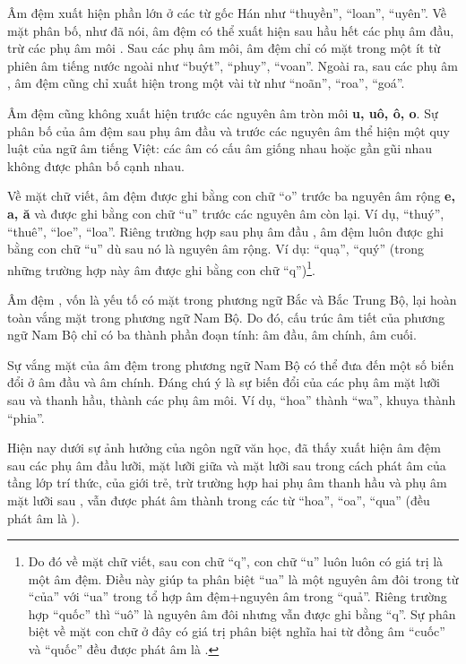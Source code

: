\documentclass[a4paper,oneside,14pt]{extbook} %
\begin{document}
Âm đệm   xuất hiện phần lớn ở các từ gốc Hán như
``thuyền'', ``loan'', ``uyên''. Về mặt phân bố, như đã nói, âm đệm có
thể xuất hiện sau hầu hết các phụ âm đầu, trừ các phụ âm môi
. Sau các phụ âm môi, âm đệm chỉ có mặt trong
một ít từ phiên âm tiếng nước ngoài như ``buýt'', ``phuy'',
``voan''. Ngoài ra, sau các phụ âm , âm đệm
 cũng chỉ xuất hiện trong một vài từ như ``noãn'',
``roa'', ``goá''.

Âm đệm  cũng không xuất hiện trước các nguyên âm tròn
môi \textbf{u, uô, ô, o}. Sự phân bố của âm đệm sau phụ âm đầu và
trước các nguyên âm thể hiện một quy luật của ngữ âm tiếng Việt: các
âm có cấu âm giống nhau hoặc gần gũi nhau không được phân bố cạnh
nhau.

Về mặt chữ viết, âm đệm  được ghi bằng con chữ ``o''
trước ba nguyên âm rộng \textbf{e, a, ă} và được ghi bằng con chữ
``u'' trước các nguyên âm còn lại. Ví dụ, ``thuý'', ``thuê'', ``loe'',
``loa''. Riêng trường hợp sau phụ âm đầu , âm đệm
 luôn được ghi bằng con chữ ``u'' dù sau nó là nguyên
âm rộng. Ví dụ: ``quạ'', ``quý'' (trong những trường hợp này âm
 được ghi bằng con chữ ``q'')\footnote{Do đó về mặt chữ
  viết, sau con chữ ``q'', con chữ ``u'' luôn luôn có giá trị là một
  âm đệm. Điều này giúp ta phân biệt ``ua'' là một nguyên âm đôi trong
từ ``của'' với ``ua'' trong tổ hợp âm đệm+nguyên âm trong
``quả''. Riêng trường hợp ``quốc'' thì ``uô'' là nguyên âm đôi nhưng
 vẫn được ghi bằng ``q''. Sự phân biệt về mặt con chữ ở
đây có giá trị phân biệt nghĩa hai từ đồng âm ``cuốc'' và ``quốc'' đều
được phát âm là .}.

Âm đệm , vốn là yếu tố có mặt trong phương ngữ Bắc và
Bắc Trung Bộ, lại hoàn toàn vắng mặt trong phương ngữ Nam Bộ. Do đó,
cấu trúc âm tiết của phương ngữ Nam Bộ chỉ có ba thành phần đoạn tính:
âm đầu, âm chính, âm cuối.

Sự vắng mặt của âm đệm trong phương ngữ Nam Bộ có thể đưa đến một số
biến đổi ở âm đầu và âm chính. Đáng chú ý là sự biến đổi của các phụ
âm mặt lưỡi sau và thanh hầu, thành các phụ âm môi. Ví dụ, ``hoa''
thành ``wa'', khuya thành ``phia''.

Hiện nay dưới sự ảnh hưởng của ngôn ngữ văn học, đã thấy xuất hiện âm
đệm sau các phụ âm đầu lưỡi, mặt lưỡi giữa và mặt lưỡi sau trong cách
phát âm của tầng lớp trí thức, của giới trẻ, trừ trường hợp hai phụ âm
thanh hầu  và phụ âm mặt lưỡi sau , vẫn
được phát âm thành \textipa{[w-]} trong các từ ``hoa'', ``oa'',
``qua'' (đều phát âm là \textipa{[wa]}).
\end{document}
